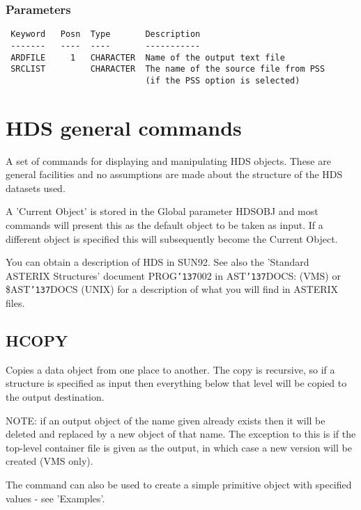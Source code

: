 \documentclass{book}
\renewcommand{\_}{{\tt\char'137}}     %
\begin{document}
\subsection{Parameters}
\begin{verbatim}
 Keyword   Posn  Type       Description
 -------   ----  ----       -----------
 ARDFILE     1   CHARACTER  Name of the output text file
 SRCLIST         CHARACTER  The name of the source file from PSS
                            (if the PSS option is selected)

\end{verbatim}\chapter{HDS general commands}
A set of commands for displaying and manipulating HDS objects.
These are general facilities and no assumptions are made about
the structure of the HDS datasets used.

A 'Current Object' is stored in the Global parameter HDSOBJ and
most commands will present this as the default object to be taken
as input. If a different object is specified this will
subsequently become the Current Object.

You can obtain a description of HDS in SUN92. See also
the 'Standard ASTERIX Structures' document PROG\_002 in
AST\_DOCS: (VMS) or \$AST\_DOCS (UNIX) for a description of
what you will find in ASTERIX files.

\section{HCOPY}
Copies a data object from one place to another. The copy is
recursive, so if a structure is specified as input then
everything below that level will be copied to the output
destination.

NOTE: if an output object of the name given already exists then
it will be deleted and replaced by a new object of that name. The
exception to this is if the top-level container file is given as
the output, in which case a new version will be created (VMS only).

The command can also be used to create a simple primitive object
with specified values - see 'Examples'.
\end{document}

